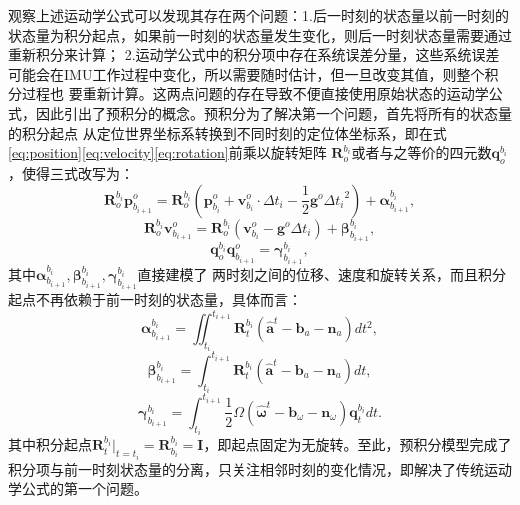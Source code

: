 观察上述运动学公式可以发现其存在两个问题：1.后一时刻的状态量以前一时刻的状态量为积分起点，如果前一时刻的状态量发生变化，则后一时刻状态量需要通过重新积分来计算；
2.运动学公式中的积分项中存在系统误差分量，这些系统误差可能会在IMU工作过程中变化，所以需要随时估计，但一旦改变其值，则整个积分过程也
要重新计算。这两点问题的存在导致不便直接使用原始状态的运动学公式，因此引出了预积分的概念。预积分为了解决第一个问题，首先将所有的状态量的积分起点
从定位世界坐标系转换到不同时刻的定位体坐标系，即在式\eqref{eq:position}\eqref{eq:velocity}\eqref{eq:rotation}前乘以旋转矩阵
$\symbf{R}_o^{b_i}$或者与之等价的四元数$\symbf{q}_o^{b_i}$，使得三式改写为：
\begin{equation}
  \label{eq:relposition}
  \symbf{R}_o^{b_i}\symbf{p}_{b_{i+1}}^o=\symbf{R}_o^{b_i}(\symbf{p}_{b_i}^o+\symbf{v}_{b_i}^o\cdot\Delta t_i - \frac{1}{2}\symbf{g}^o{\Delta t_i}^2)+\symbf{\alpha}_{b_{i+1}}^{b_i},
\end{equation}
\begin{equation}
  \label{eq:relvolicity}
  \symbf{R}_o^{b_i}\symbf{v}_{b_{i+1}}^o=\symbf{R}_o^{b_i}(\symbf{v}_{b_i}^o-\symbf{g}^o\Delta t_i)+\symbf{\beta}_{b_{i+1}}^{b_i},
\end{equation}
\begin{equation}
  \label{eq:relrotation}
  \symbf{q}_o^{b_i}\symbf{q}_{b_{i+1}}^o=\symbf{\gamma}_{b_{i+1}}^{b_i},
\end{equation}
其中$\symbf{\alpha}_{b_{i+1}}^{b_i},\symbf{\beta}_{b_{i+1}}^{b_i},\symbf{\gamma}_{b_{i+1}}^{b_i}$直接建模了
两时刻之间的位移、速度和旋转关系，而且积分起点不再依赖于前一时刻的状态量，具体而言：
\begin{equation}
  \label{eq:preintposition}
  \symbf{\alpha}_{b_{i+1}}^{b_i}=\iint_{t_i}^{t_{i+1}}\symbf{R}_t^{b_i}(\symbf{\hat{a}}^t-\symbf{b}_{a}-\symbf{n}_{a}) dt^2,
\end{equation}
\begin{equation}
  \label{eq:preintvelocity}
  \symbf{\beta}_{b_{i+1}}^{b_i}=\int_{t_i}^{t_{i+1}}\symbf{R}_t^{b_i}(\symbf{\hat{a}}^t-\symbf{b}_{a}-\symbf{n}_{a}) dt,
\end{equation}
\begin{equation}
  \label{eq:preintrotation}
  \symbf{\gamma}_{b_{i+1}}^{b_i}=\int_{t_i}^{t_{i+1}}\frac12\Omega(\widehat{\symbf{\omega}}^t-\symbf{b}_\omega-\symbf{n}_\omega)\symbf{q}_t^{b_i}dt.
\end{equation}
其中积分起点$\symbf{R}_t^{b_i}|_{t=t_i}=\symbf{R}_{b_i}^{b_i}=\symbf{I}$，即起点固定为无旋转。至此，预积分模型完成了
积分项与前一时刻状态量的分离，只关注相邻时刻的变化情况，即解决了传统运动学公式的第一个问题。

